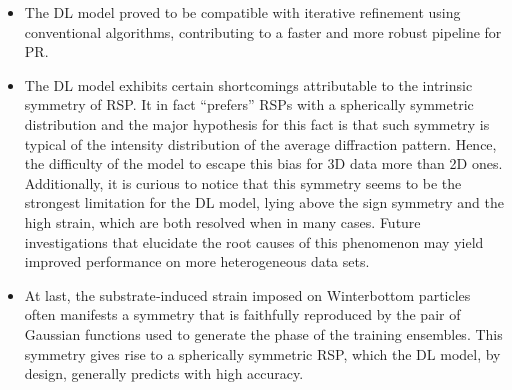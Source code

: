 \begin{itemize}
    \item The DL model proved to be compatible with iterative refinement using conventional algorithms, contributing to 
    a faster and more robust pipeline for PR. 

    \item The DL model exhibits certain shortcomings attributable to the intrinsic symmetry of RSP. It in fact ``prefers''
    RSPs with a spherically symmetric distribution and the major hypothesis for this fact is that such symmetry is typical 
    of the intensity distribution of the average diffraction pattern. Hence, the difficulty of the model to escape this
    bias for 3D data more than 2D ones. Additionally, it is curious to notice that this symmetry seems to be the strongest 
    limitation for the DL model, lying above the sign symmetry and the high strain, which are both resolved when in many cases. 
    Future investigations that elucidate the root causes of this phenomenon may yield improved performance on more heterogeneous 
    data sets. 
    
    \item At last, the substrate‐induced strain imposed on Winterbottom particles often manifests a symmetry that is faithfully 
    reproduced by the pair of Gaussian functions used to generate the phase of the training ensembles. This symmetry gives rise to 
    a spherically symmetric RSP, which the DL model, by design, generally predicts with high accuracy. 

  \end{itemize}

